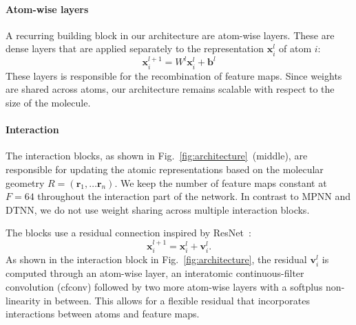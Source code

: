 \documentclass{article}
\newcommand{\rr}{\mathbf{r}}
\newcommand{\x}{\mathbf{x}}
\newcommand{\vv}{\mathbf{v}}
\begin{document}
\paragraph{Atom-wise layers}
A recurring building block in our architecture are atom-wise layers.
These are dense layers that are applied separately to the representation $\x^{l}_i$ of atom $i$:
\[
\x^{l+1}_i = W^l \x^{l}_i + \mathbf{b}^l
\]
These layers is responsible for the recombination of feature maps.
Since weights are shared across atoms, our architecture remains scalable with respect to the size of the molecule.

\paragraph{Interaction}
The interaction blocks, as shown in Fig.~\ref{fig:architecture}~(middle), are responsible for updating the atomic representations based on the molecular geometry $R=(\rr_1, \dots \rr_n)$. 
We keep the number of feature maps constant at $F=64$ throughout the interaction part of the network.
In contrast to MPNN and DTNN, we do not use weight sharing across multiple interaction blocks.

The blocks use a residual connection inspired by ResNet~\citep{he2016deep}:
\[
\x_i^{l+1} = \x_i^{l} + \vv_i^{l}.
\]
As shown in the interaction block in Fig.~\ref{fig:architecture}, the residual $\vv_i^l$ is computed through an atom-wise layer, an interatomic continuous-filter convolution (cfconv) followed by two more atom-wise layers with a softplus non-linearity in between.
This allows for a flexible residual that incorporates interactions between atoms and feature maps.
\end{document}
